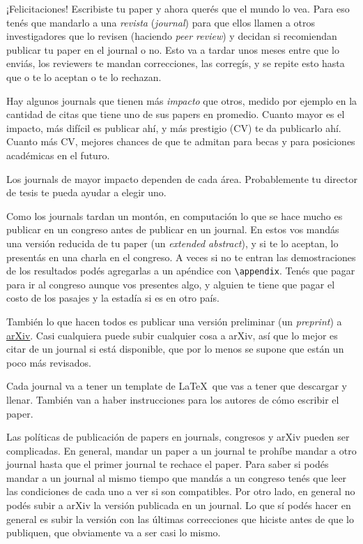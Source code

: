 \documentclass{article}
\begin{document}
¡Felicitaciones! Escribiste tu paper y ahora querés que el mundo lo vea. Para eso tenés que mandarlo a una \emph{revista} (\emph{journal}) para que ellos llamen a otros investigadores que lo revisen (haciendo \emph{peer review}) y decidan si recomiendan publicar tu paper en el journal o no. Esto va a tardar unos meses entre que lo enviás, los reviewers te mandan correcciones, las corregís, y se repite esto hasta que o te lo aceptan o te lo rechazan.

Hay algunos journals que tienen más \emph{impacto} que otros, medido por ejemplo en la cantidad de citas que tiene uno de sus papers en promedio. Cuanto mayor es el impacto, más difícil es publicar ahí, y más prestigio (CV) te da publicarlo ahí. Cuanto más CV, mejores chances de que te admitan para becas y para posiciones académicas en el futuro.

Los journals de mayor impacto dependen de cada área. Probablemente tu director de tesis te pueda ayudar a elegir uno.

Como los journals tardan un montón, en computación lo que se hace mucho es publicar en un congreso antes de publicar en un journal. En estos vos mandás una versión reducida de tu paper (un \emph{extended abstract}), y si te lo aceptan, lo presentás en una charla en el congreso. A veces si no te entran las demostraciones de los resultados podés agregarlas a un apéndice con \verb|\appendix|. Tenés que pagar para ir al congreso aunque vos presentes algo, y alguien te tiene que pagar el costo de los pasajes y la estadía si es en otro país.

También lo que hacen todos es publicar una versión preliminar (un \emph{preprint}) a \href{https://arxiv.org/}{arXiv}. Casi cualquiera puede subir cualquier cosa a arXiv, así que lo mejor es citar de un journal si está disponible, que por lo menos se supone que están un poco más revisados.

Cada journal va a tener un template de \LaTeX\ que vas a tener que descargar y llenar. También van a haber instrucciones para los autores de cómo escribir el paper.

Las políticas de publicación de papers en journals, congresos y arXiv pueden ser complicadas. En general, mandar un paper a un journal te prohíbe mandar a otro journal hasta que el primer journal te rechace el paper. Para saber si podés mandar a un journal al mismo tiempo que mandás a un congreso tenés que leer las condiciones de cada uno a ver si son compatibles. Por otro lado, en general no podés subir a arXiv la versión publicada en un journal. Lo que sí podés hacer en general es subir la versión con las últimas correcciones que hiciste antes de que lo publiquen, que obviamente va a ser casi lo mismo.
\end{document}
